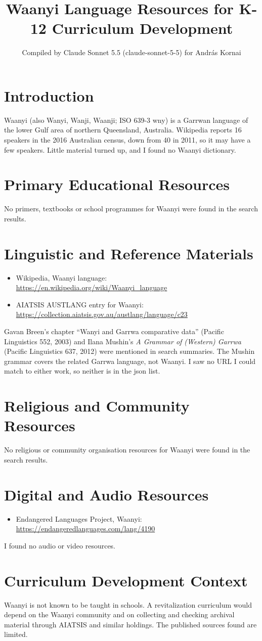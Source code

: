 \documentclass[12pt]{article}
\title{Waanyi Language Resources for K-12 Curriculum Development}
\author{Compiled by Claude Sonnet 5.5 (claude-sonnet-5-5) for Andr\'as Kornai}
\date{}
\begin{document}
\maketitle

\section{Introduction}
Waanyi (also Wanyi, Wanji, Waanji; ISO 639-3 wny) is a Garrwan language of the lower Gulf area of northern Queensland, Australia. Wikipedia reports 16 speakers in the 2016 Australian census, down from 40 in 2011, so it may have a few speakers. Little material turned up, and I found no Waanyi dictionary.

\section{Primary Educational Resources}
No primers, textbooks or school programmes for Waanyi were found in the search results.

\section{Linguistic and Reference Materials}
\begin{itemize}
\item Wikipedia, Waanyi language: \url{https://en.wikipedia.org/wiki/Waanyi_language}
\item AIATSIS AUSTLANG entry for Waanyi: \url{https://collection.aiatsis.gov.au/austlang/language/c23}
\end{itemize}
Gavan Breen's chapter ``Wanyi and Garrwa comparative data'' (Pacific Linguistics 552, 2003) and Ilana Mushin's \emph{A Grammar of (Western) Garrwa} (Pacific Linguistics 637, 2012) were mentioned in search summaries. The Mushin grammar covers the related Garrwa language, not Waanyi. I saw no URL I could match to either work, so neither is in the json list.

\section{Religious and Community Resources}
No religious or community organisation resources for Waanyi were found in the search results.

\section{Digital and Audio Resources}
\begin{itemize}
\item Endangered Languages Project, Waanyi: \url{https://endangeredlanguages.com/lang/4190}
\end{itemize}
I found no audio or video resources.

\section{Curriculum Development Context}
Waanyi is not known to be taught in schools. A revitalization curriculum would depend on the Waanyi community and on collecting and checking archival material through AIATSIS and similar holdings. The published sources found are limited.
\end{document}
